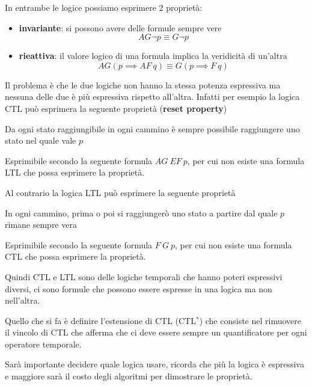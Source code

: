 In entrambe le logice possiamo esprimere 2 proprietà:
\begin{itemize}
    \item \textbf{invariante}: si possono avere delle formule sempre vere
    \begin{equation}
        AG\lnot p \equiv G\lnot p
    \end{equation}
    \item \textbf{rieattiva}: il valore logico di una formula implica la veridicità
    di un'altra
    \begin{equation}
        AG (p\implies AF \ q) \equiv G(p\implies F \ q)
    \end{equation}
\end{itemize}

Il problema è che le due logiche non hanno la stessa potenza espressiva ma nessuna
delle due è più espressiva rispetto all'altra. Infatti per esempio la logica CTL 
può esprimera la seguente proprietà (\textbf{reset property})
\begin{center}
    Da ogni stato raggiungibile in ogni cammino
    è sempre possibile raggiungere uno stato nel quale vale $p$
\end{center}
Esprimibile secondo la seguente formula $AG \ EF \ p$, per cui non esiste una formula
LTL che possa esprimere la proprietà.

Al contrario la logica LTL può esprimere la seguente proprietà
\begin{center}
    In ogni cammino, prima o poi si raggiungerò uno stato a partire dal quale $p$
    rimane sempre vera
\end{center}
Esprimibile secondo la seguente formula $F \ G \ p$, per cui non esiste una formula
CTL che possa esprimere la proprietà.

Quindi CTL e LTL sono delle logiche temporali che hanno poteri espressivi diversi,
ci sono formule che possono essere espresse in una logica ma non nell'altra.

Quello che si fa è definire l'estensione di CTL (CTL$^\ast$) che consiste nel rimuovere il vincolo
di CTL che afferma che ci deve essere sempre un quantificatore per ogni operatore
temporale. 

Sarà importante decidere quale logica usare, ricorda che più la logica è espressiva e 
maggiore sarà il costo degli algoritmi per dimostrare le proprietà.

